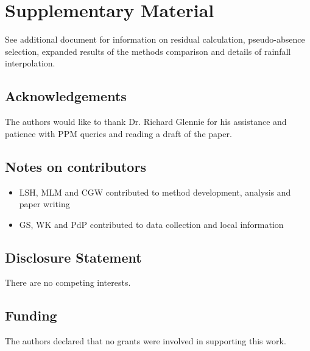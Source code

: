 \documentclass[letterpaper]{interact}
\begin{document}
\section{Supplementary Material}\label{supplementary-material}

See additional document for information on residual calculation, pseudo-absence selection, expanded results of the methods comparison and details of rainfall interpolation.

\subsection*{Acknowledgements}
The authors would like to thank Dr. Richard Glennie for his assistance and patience with PPM queries and reading a draft of the paper. 

\subsection*{Notes on contributors}
\begin{itemize}
    \item LSH, MLM and CGW contributed to method development, analysis and paper writing
    \item GS, WK and PdP contributed to data collection and local information
\end{itemize}

\subsection*{Disclosure Statement}

There are no competing interests. 

\subsection*{Funding}
%
The authors declared that no grants were involved in supporting this work.



{\small
}

\bigskip
\end{document}
